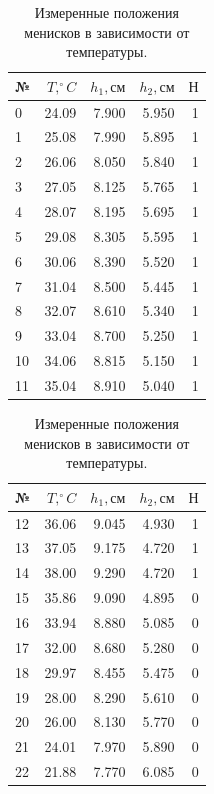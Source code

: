 \documentclass[a4paper, 12pt]{article}
\begin{document}
    \begin{table}[h!]
        \vspace{5pt}
        \begin{center}
        \subtable
        {
            \begin{tabular}{|l|rrr|r|}
            \hline
            № &    $T, ^\circ C$ &    $h_1, см$ &  $h_2, см$ & $Н$ \\
            \hline
            0  &  24.09 &  7.900 &  5.950 &     1 \\
            1  &  25.08 &  7.990 &  5.895 &     1 \\
            2  &  26.06 &  8.050 &  5.840 &     1 \\
            3  &  27.05 &  8.125 &  5.765 &     1 \\
            4  &  28.07 &  8.195 &  5.695 &     1 \\
            5  &  29.08 &  8.305 &  5.595 &     1 \\
            6  &  30.06 &  8.390 &  5.520 &     1 \\
            7  &  31.04 &  8.500 &  5.445 &     1 \\
            8  &  32.07 &  8.610 &  5.340 &     1 \\
            9  &  33.04 &  8.700 &  5.250 &     1 \\
            10 &  34.06 &  8.815 &  5.150 &     1 \\
            11 &  35.04 &  8.910 &  5.040 &     1 \\
            \hline
            \end{tabular}
        }
        \subtable
        {
            \begin{tabular}{|l|rrr|r|}
            \hline
            № &    $T, ^\circ C$ &    $h_1, см$ &  $h_2, см$ & $Н$ \\
            \hline
            12 &  36.06 &  9.045 &  4.930 &     1 \\
            13 &  37.05 &  9.175 &  4.720 &     1 \\
            14 &  38.00 &  9.290 &  4.720 &     1 \\
            15 &  35.86 &  9.090 &  4.895 &     0 \\
            16 &  33.94 &  8.880 &  5.085 &     0 \\
            17 &  32.00 &  8.680 &  5.280 &     0 \\
            18 &  29.97 &  8.455 &  5.475 &     0 \\
            19 &  28.00 &  8.290 &  5.610 &     0 \\
            20 &  26.00 &  8.130 &  5.770 &     0 \\
            21 &  24.01 &  7.970 &  5.890 &     0 \\
            22 &  21.88 &  7.770 &  6.085 &     0 \\
            \hline
            \end{tabular}
        }

        \caption{Измеренные положения менисков в зависимости от температуры.}
        \label{data_raw}
        \end{center}
    \end{table}
\end{document}
